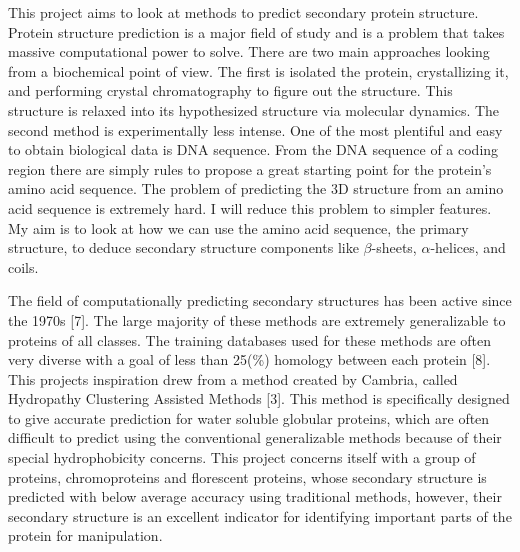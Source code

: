 \documentclass{article}
\begin{document}
This project aims to look at methods to predict secondary protein structure. Protein structure prediction is a major field of study and is a problem that takes massive computational power to solve. There are two main approaches looking from a biochemical point of view. The first is isolated the protein, crystallizing it, and performing crystal chromatography to figure out the structure. This structure is relaxed into its hypothesized structure via molecular dynamics. The second method is experimentally less intense. One of the most plentiful and easy to obtain biological data is DNA sequence. From the DNA sequence of a coding region there are simply rules to propose a great starting point for the protein's amino acid sequence. The problem of predicting the 3D structure from an amino acid sequence is extremely hard. I will reduce this problem to simpler features. My aim is to look at how we can use the amino acid sequence, the primary structure, to deduce secondary structure components like $\beta$-sheets, $\alpha$-helices, and coils. 

The field of computationally predicting secondary structures has been active since the 1970s [7]. The large majority of these methods are extremely generalizable to proteins of all classes. The training databases used for these methods are often very diverse with a goal of less than 25(\%) homology between each protein [8]. This projects inspiration drew from a method created by Cambria, called Hydropathy Clustering Assisted Methods [3]. This method is specifically designed to give accurate prediction for water soluble globular proteins, which are often difficult to predict using the conventional generalizable methods because of their special hydrophobicity concerns. This project concerns itself with a group of proteins, chromoproteins and florescent proteins, whose secondary structure is predicted with below average accuracy using traditional methods, however, their secondary structure is an excellent indicator for identifying important parts of the protein for manipulation.
\end{document}
